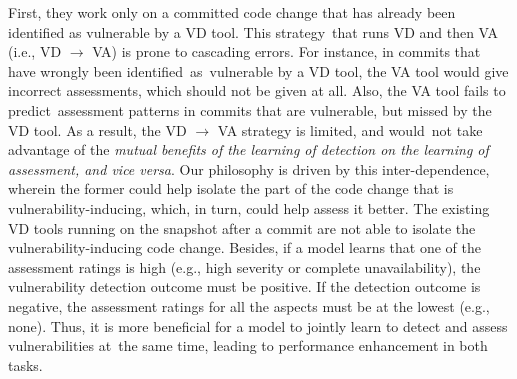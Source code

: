 First, they work only on a committed code change that has already been identified as vulnerable by a VD tool.
This strategy~that runs VD and then VA (i.e., VD $\rightarrow$ VA)
is prone to cascading errors.
For instance, in commits that have wrongly been
identified~as~vulnerable by a VD tool, the VA tool would give
incorrect assessments, which should not be given at all.  Also, the VA
tool fails to predict~assessment patterns in commits that are
vulnerable, but missed by the VD tool.  As a result, the VD
$\rightarrow$ VA strategy is limited, and would~not take advantage of
the {\em mutual benefits of the learning of detection on the learning
  of assessment, and vice versa}.  Our philosophy is driven by this
inter-dependence, wherein the former could help isolate the part of
the code change that is vulnerability-inducing, which, in turn, could
help assess it better. The existing VD tools running on the snapshot
after a commit are not able to isolate the vulnerability-inducing code
change.
%
Besides, if a model learns that one of the
assessment ratings is high (e.g., high severity or complete
unavailability), the vulnerability detection outcome must be
positive. If the detection outcome is negative, the assessment ratings
for all the aspects must be at the lowest (e.g., none). Thus, it is
more beneficial for a model to jointly learn to detect and assess
vulnerabilities at~the same time, leading to performance enhancement
in both tasks.

